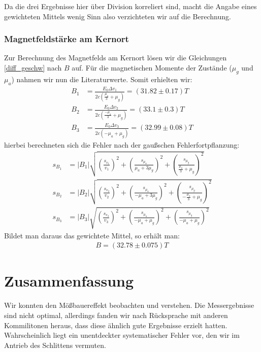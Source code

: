 \documentclass[12pt]{article}
\begin{document}
Da die drei Ergebnisse hier über Division korreliert sind, macht die Angabe eines gewichteten Mittels wenig Sinn also verzichteten wir auf die Berechnung.

\subsubsection{Magnetfeldstärke am Kernort}
Zur Berechnung des Magnetfelds am Kernort lösen wir die Gleichungen \ref{diff_geschw} nach $B$ auf. Für die magnetischen Momente der Zustände ($\mu_g$ 
und $\mu_a$) nahmen wir nun die Literaturwerte. Somit erhielten wir:
\begin{align*}
 B_1 &= \frac{E_0 \Delta v_1}{2c \left( \frac{\mu_a}{3}+\mu_g \right) } = (31.82\pm0.17)T \\
 B_2 &= \frac{E_0 \Delta v_2}{2c \left( \frac{-\mu_a}{3}+\mu_g \right) } = (33.1\pm0.3)T \\
 B_3 &= \frac{E_0 \Delta v_3}{2c \left( -\mu_a+\mu_g \right) } = (32.99\pm0.08)T
\end{align*}
hierbei berechneten sich die Fehler nach der gaußschen Fehlerfortpflanzung:
\begin{align*}
 s_{B_1} &= \left| B_1 \right| \sqrt{\left( \frac{s_{v_1}}{v_1} \right) ^2 + \left( \frac{s_{\mu_a}}{\mu_a+3\mu_g} \right) ^2 + \left( \frac{s_{\mu_g}}{\frac{\mu_a}{3}+\mu_g} \right) ^2} \\
 s_{B_2} &= \left| B_2 \right| \sqrt{\left( \frac{s_{v_2}}{v_2} \right) ^2 + \left( \frac{s_{\mu_a}}{-\mu_a+3\mu_g} \right) ^2 + \left( \frac{s_{\mu_g}}{-\frac{\mu_a}{3}+\mu_g} \right) ^2} \\
 s_{B_3} &= \left| B_3 \right| \sqrt{\left( \frac{s_{v_3}}{v_3} \right) ^2 + \left( \frac{s_{\mu_a}}{-\mu_a+\mu_g} \right) ^2 + \left( \frac{s_{\mu_g}}{-\mu_a+\mu_g} \right) ^2} 
\end{align*}
Bildet man daraus das gewichtete Mittel, so erhält man:
\begin{align*}
 B = (32.78 \pm 0.075)T
\end{align*}

\section{Zusammenfassung}
Wir konnten den Mößbauereffekt beobachten und verstehen. Die Messergebnisse sind nicht optimal, allerdings fanden wir nach Rücksprache mit anderen
Kommilitonen heraus, dass diese ähnlich gute Ergebnisse erzielt hatten. Wahrscheinlich liegt ein unentdeckter systematischer Fehler vor, den wir im Antrieb des 
Schlittens vermuten.
\end{document}
